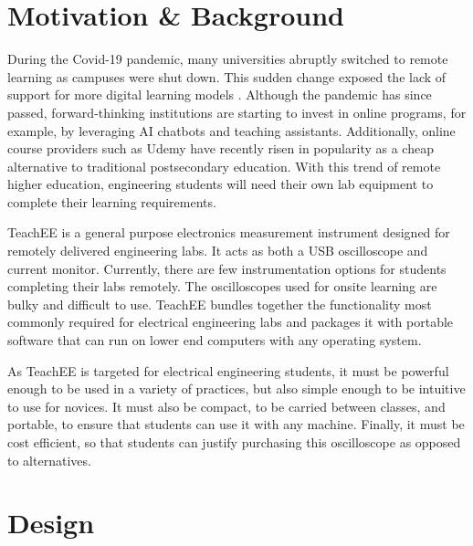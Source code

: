 \documentclass[letterpaper,11pt]{article}
\begin{document}
\section{Motivation \& Background}
During the Covid-19 pandemic, many universities abruptly switched to remote
learning as campuses were shut down. This sudden change exposed the lack of
support for more digital learning models \cite{online_learning}. Although the
pandemic has since passed, forward-thinking institutions are starting to invest
in online programs, for example, by leveraging AI chatbots and teaching assistants.
Additionally, online course providers such as Udemy have recently risen in popularity
as a cheap alternative to traditional postsecondary education. With this trend of
remote higher education, engineering students will need their own lab equipment to
complete their learning requirements.

TeachEE is a general purpose electronics measurement instrument
designed for remotely delivered engineering labs. It acts as both a
USB oscilloscope and current monitor. Currently, there are few instrumentation
options for students completing their labs remotely. The oscilloscopes used for
onsite learning are bulky and difficult to use. TeachEE bundles
together the functionality most commonly required for electrical engineering
labs and packages it with portable software that can run on lower end computers
with any operating system.

As TeachEE is targeted for electrical engineering students, it must be powerful
enough to be used in a variety of practices, but also simple enough to
be intuitive to use for novices. It must also be compact, to be carried between classes,
and portable, to ensure that students can use it with any machine. Finally, it must be
cost efficient, so that students can justify purchasing this oscilloscope
as opposed to alternatives.

\section{Design}
\end{document}
